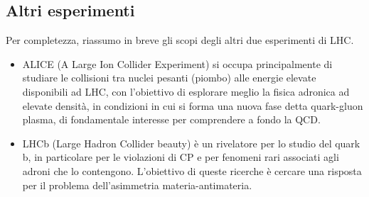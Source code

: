 \subsection{Altri esperimenti}
Per completezza, riassumo in breve gli scopi degli altri due esperimenti di LHC.
\begin{itemize}
\item ALICE (A Large Ion Collider Experiment) si occupa principalmente di studiare le collisioni tra nuclei pesanti (piombo) alle energie elevate disponibili ad LHC, con l'obiettivo di esplorare meglio la fisica adronica ad elevate densit\`a, in condizioni in cui si forma una nuova fase detta quark-gluon plasma, di fondamentale interesse per comprendere a fondo la QCD.
\item LHCb (Large Hadron Collider beauty) \`e un rivelatore per lo studio del quark b, in particolare per le violazioni di CP e per fenomeni rari associati agli adroni che lo contengono. L'obiettivo di queste ricerche \`e cercare una risposta per il problema dell'asimmetria materia-antimateria.
\end{itemize}
\clearpage
